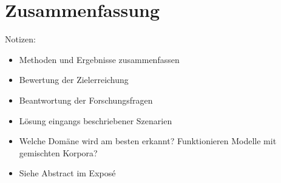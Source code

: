 \chapter{Zusammenfassung}
\thispagestyle{fancy}
\label{chap:Zusammenfassung}

Notizen:
\begin{itemize}
	\item Methoden und Ergebnisse zusammenfassen
	\item Bewertung der Zielerreichung
	\item Beantwortung der Forschungsfragen
	\item Lösung eingangs beschriebener Szenarien
	\item Welche Domäne wird am besten erkannt? Funktionieren Modelle mit gemischten Korpora?
	\item Siehe Abstract im Exposé
\end{itemize}
